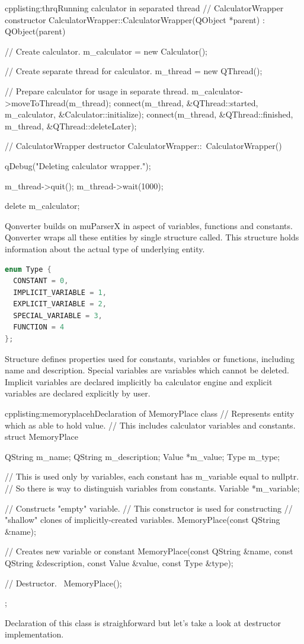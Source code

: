 \begin{fdoccode}{cpp}{listing:thrq}{Running calculator in separated thread}
// CalculatorWrapper constructor
CalculatorWrapper::CalculatorWrapper(QObject *parent) : QObject(parent) {
    // Create calculator.
    m_calculator = new Calculator();

    // Create separate thread for calculator.
    m_thread = new QThread();

    // Prepare calculator for usage in separate thread.
    m_calculator->moveToThread(m_thread);
    connect(m_thread, &QThread::started, m_calculator, &Calculator::initialize);
    connect(m_thread, &QThread::finished, m_thread, &QThread::deleteLater);
}

// CalculatorWrapper destructor
CalculatorWrapper::~CalculatorWrapper() {
    qDebug("Deleting calculator wrapper.");

    m_thread->quit();
    m_thread->wait(1000);

    delete m_calculator;
}
\end{fdoccode}

Qonverter builds on muParserX in aspect of variables, functions and constants. Qonverter wraps all these entities by single structure called. This structure holds information about the actual type of underlying entity.
\begin{lstlisting}[firstnumber=1,language=cpp]
enum Type {
  CONSTANT = 0,
  IMPLICIT_VARIABLE = 1,
  EXPLICIT_VARIABLE = 2,
  SPECIAL_VARIABLE = 3,
  FUNCTION = 4
};
\end{lstlisting}
Structure defines properties used for constants, variables or functions, including name and description. Special variables are variables which cannot be deleted. Implicit variables are declared implicitly ba calculator engine and explicit variables are declared explicitly by user.

\begin{fdoccode}{cpp}{listing:memoryplaceh}{Declaration of MemoryPlace class}
// Represents entity which as able to hold value.
// This includes calculator variables and constants.
struct MemoryPlace {
    QString m_name;
    QString m_description;
    Value *m_value;
    Type m_type;

    // This is used only by variables, each constant has m_variable equal to nullptr.
    // So there is way to distinguish variables from constants.
    Variable *m_variable;

    // Constructs "empty" variable.
    // This constructor is used for constructing
    // "shallow" clones of implicitly-created variables.
    MemoryPlace(const QString &name);

    // Creates new variable or constant
    MemoryPlace(const QString &name, const QString &description,
                const Value &value, const Type &type);

    // Destructor.
    ~MemoryPlace();
};
\end{fdoccode}
Declaration of this class is straighforward but let's take a look at destructor implementation.

